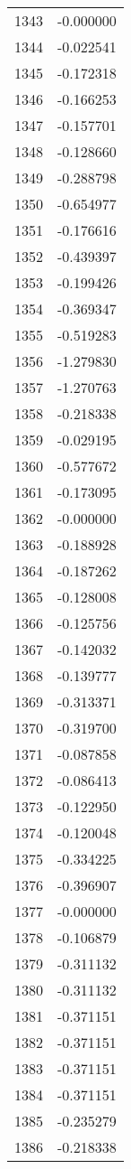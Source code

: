\documentclass[12pt]{article}
\begin{document}
\begin{longtable}{@{}cc@{}}
1343 & -0.000000 \\
1344 & -0.022541 \\
1345 & -0.172318 \\
1346 & -0.166253 \\
1347 & -0.157701 \\
1348 & -0.128660 \\
1349 & -0.288798 \\
1350 & -0.654977 \\
1351 & -0.176616 \\
1352 & -0.439397 \\
1353 & -0.199426 \\
1354 & -0.369347 \\
1355 & -0.519283 \\
1356 & -1.279830 \\
1357 & -1.270763 \\
1358 & -0.218338 \\
1359 & -0.029195 \\
1360 & -0.577672 \\
1361 & -0.173095 \\
1362 & -0.000000 \\
1363 & -0.188928 \\
1364 & -0.187262 \\
1365 & -0.128008 \\
1366 & -0.125756 \\
1367 & -0.142032 \\
1368 & -0.139777 \\
1369 & -0.313371 \\
1370 & -0.319700 \\
1371 & -0.087858 \\
1372 & -0.086413 \\
1373 & -0.122950 \\
1374 & -0.120048 \\
1375 & -0.334225 \\
1376 & -0.396907 \\
1377 & -0.000000 \\
1378 & -0.106879 \\
1379 & -0.311132 \\
1380 & -0.311132 \\
1381 & -0.371151 \\
1382 & -0.371151 \\
1383 & -0.371151 \\
1384 & -0.371151 \\
1385 & -0.235279 \\
1386 & -0.218338 \\

\end{longtable}
\end{document}
